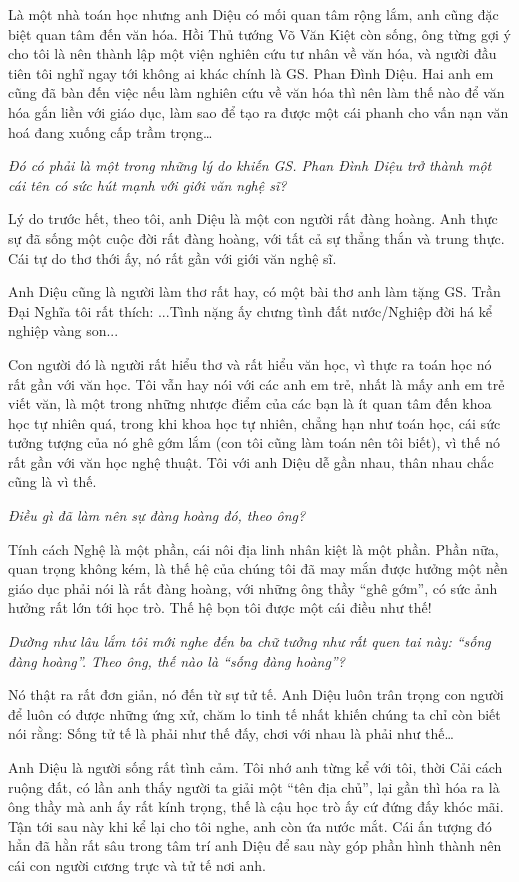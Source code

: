 Là một nhà toán học nhưng anh Diệu có mối quan tâm rộng lắm, anh cũng đặc biệt quan tâm đến văn hóa. Hồi Thủ tướng Võ Văn Kiệt còn sống, ông từng gợi ý cho tôi là nên thành lập một viện nghiên cứu tư nhân về văn hóa, và người đầu tiên tôi nghĩ ngay tới không ai khác chính là GS. Phan Đình Diệu. Hai anh em cũng đã bàn đến việc nếu làm nghiên cứu về văn hóa thì nên làm thế nào để văn hóa gắn liền với giáo dục, làm sao để tạo ra được một cái phanh cho vấn nạn văn hoá đang xuống cấp trầm trọng… 

\emph{Đó có phải là một trong những lý do khiến GS. Phan Đình Diệu trở thành một cái tên có sức hút mạnh với giới văn nghệ sĩ?}

Lý do trước hết, theo tôi, anh Diệu là một con người rất đàng hoàng. Anh thực sự đã sống một cuộc đời rất đàng hoàng, với tất cả sự thẳng thắn và trung thực. Cái tự do thơ thới ấy, nó rất gần với giới văn nghệ sĩ.

Anh Diệu cũng là người làm thơ rất hay, có một bài thơ anh làm tặng GS. Trần Đại Nghĩa tôi rất thích: ...Tình nặng ấy chưng tình đất nước/Nghiệp đời há kể nghiệp vàng son...

Con người đó là người rất hiểu thơ và rất hiểu văn học, vì thực ra toán học nó rất gần với văn học. Tôi vẫn hay nói với các anh em trẻ, nhất là mấy anh em trẻ viết văn, là một trong những nhược điểm của các bạn là ít quan tâm đến khoa học tự nhiên quá, trong khi khoa học tự nhiên, chẳng hạn như toán học, cái sức tưởng tượng của nó ghê gớm lắm (con tôi cũng làm toán nên tôi biết), vì thế nó rất gần với văn học nghệ thuật. Tôi với anh Diệu dễ gần nhau, thân nhau chắc cũng là vì thế.


\emph{Điều gì đã làm nên sự đàng hoàng đó, theo ông?}

Tính cách Nghệ là một phần, cái nôi địa linh nhân kiệt là một phần. Phần nữa, quan trọng không kém, là thế hệ của chúng tôi đã may mắn được hưởng một nền giáo dục phải nói là rất đàng hoàng, với những ông thầy “ghê gớm”, có sức ảnh hưởng rất lớn tới học trò. Thế hệ bọn tôi được một cái điều như thế!

\emph{Dường như lâu lắm tôi mới nghe đến ba chữ tưởng như rất quen tai này: “sống đàng hoàng”. Theo ông, thế nào là “sống đàng hoàng”?}

Nó thật ra rất đơn giản, nó đến từ sự tử tế. Anh Diệu luôn trân trọng con người để luôn có được những ứng xử, chăm lo tinh tế nhất khiến chúng ta chỉ còn biết nói rằng: Sống tử tế là phải như thế đấy, chơi với nhau là phải như thế…

Anh Diệu là người sống rất tình cảm. Tôi nhớ anh từng kể với tôi, thời Cải cách ruộng đất, có lần anh thấy người ta giải một “tên địa chủ”, lại gần thì hóa ra là ông thầy mà anh ấy rất kính trọng, thế là cậu học trò ấy cứ đứng đấy khóc mãi. Tận tới sau này khi kể lại cho tôi nghe, anh còn ứa nước mắt. Cái ấn tượng đó hẳn đã hằn rất sâu trong tâm trí anh Diệu để sau này góp phần hình thành nên cái con người cương trực và tử tế nơi anh.

